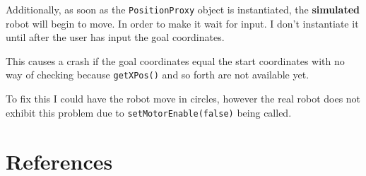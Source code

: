 \documentclass[a4paper,12pt]{article}
\begin{document}
Additionally, as soon as the \texttt{PositionProxy} object is instantiated, the \textbf{simulated} robot will begin to move. In order to make it wait for input. I don't instantiate it until after the user has input the goal coordinates. 

This causes a crash if the goal coordinates equal the start coordinates with no way of checking because \texttt{getXPos()} and so forth are not available yet. 

To fix this I could have the robot move in circles, however the real robot does not exhibit this problem due to \texttt{setMotorEnable(false)} being called.
\section{References}

\end{document}
